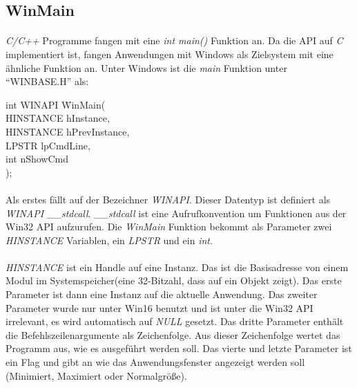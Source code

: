 \subsection{WinMain}
\paragraph{}
\textit{C/C++} Programme fangen mit eine \textit{int main()} Funktion an. Da die API auf \textit{C} implementiert ist, fangen Anwendungen mit Windows als Zielsystem mit eine ähnliche Funktion an. Unter Windows ist die \textit{main} Funktion unter "`WINBASE.H"' als:

\begin{tabbing}

int WINAPI \=WinMain(\\
    			\>HINSTANCE hInstance,\\
    			\>HINSTANCE hPrevInstance,\\
    			\>LPSTR lpCmdLine,\\
    			\>int nShowCmd\\
			\>);

\end{tabbing}

\paragraph{}
Als erstes fällt auf der Bezeichner \textit{WINAPI}. Dieser Datentyp ist definiert als \textit{WINAPI \_\_stdcall}. \textit{\_\_stdcall} ist eine Aufrufkonvention um Funktionen aus der Win32 API aufzurufen. Die \textit{WinMain} Funktion bekommt als Parameter zwei \textit{HINSTANCE} Variablen, ein \textit{LPSTR} und ein \textit{int}.

\paragraph{}
\textit{HINSTANCE} ist ein Handle auf eine Instanz. Das ist die Basisadresse von einem Modul im Systemspeicher(eine 32-Bitzahl, dass auf ein Objekt zeigt). Das erste Parameter ist dann eine Instanz auf die aktuelle Anwendung. Das zweiter Parameter wurde nur unter Win16 benutzt und ist unter die Win32 API irrelevant, es wird automatisch auf \textit{NULL} gesetzt. Das dritte Parameter enthält die Befehlszeilenargumente als Zeichenfolge. Aus dieser Zeichenfolge wertet das Programm aus, wie es ausgeführt werden soll. Das vierte und letzte Parameter ist ein Flag und gibt an wie das Anwendungsfenster angezeigt werden soll (Minimiert, Maximiert oder Normalgröße).

